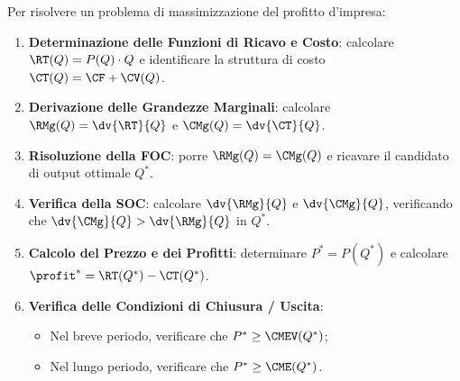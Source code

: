 \begin{metodo}
Per risolvere un problema di massimizzazione del profitto d'impresa:
\begin{enumerate}
    \item \textbf{Determinazione delle Funzioni di Ricavo e Costo}: calcolare $\RT(Q) = P(Q) \cdot Q$ e identificare la struttura di costo $\CT(Q) = \CF + \CV(Q)$.
    \item \textbf{Derivazione delle Grandezze Marginali}: calcolare $\RMg(Q) = \dv{\RT}{Q}$ e $\CMg(Q) = \dv{\CT}{Q}$.
    \item \textbf{Risoluzione della FOC}: porre $\RMg(Q) = \CMg(Q)$ e ricavare il candidato di output ottimale $Q^*$.
    \item \textbf{Verifica della SOC}: calcolare $\dv{\RMg}{Q}$ e $\dv{\CMg}{Q}$, verificando che $\dv{\CMg}{Q} > \dv{\RMg}{Q}$ in $Q^*$.
    \item \textbf{Calcolo del Prezzo e dei Profitti}: determinare $P^* = P(Q^*)$ e calcolare $\profit^* = \RT(Q^*) - \CT(Q^*)$.
    \item \textbf{Verifica delle Condizioni di Chiusura / Uscita}:
    \begin{itemize}
        \item Nel breve periodo, verificare che $P^* \ge \CMEV(Q^*)$;
        \item Nel lungo periodo, verificare che $P^* \ge \CME(Q^*)$.
    \end{itemize}
\end{enumerate}
\end{metodo}

